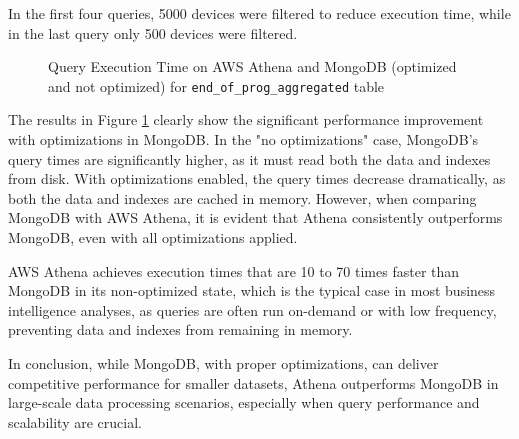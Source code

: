 In the first four queries, 5000 devices were filtered to reduce execution time, while in the last query only 500 devices were filtered.
\begin{figure}[H]
    \centering
    \caption{Query Execution Time on AWS Athena and MongoDB (optimized and not optimized) for \texttt{end\_of\_prog\_aggregated} table}
    \label{fig:eopaex}
\end{figure}

The results in Figure \ref{fig:eopaex} clearly show the significant performance improvement with optimizations in MongoDB. In the "no optimizations" case, MongoDB's query times are significantly higher, as it must read both the data and indexes from disk. With optimizations enabled, the query times decrease dramatically, as both the data and indexes are cached in memory. However, when comparing MongoDB with \ac{AWS} Athena, it is evident that Athena consistently outperforms MongoDB, even with all optimizations applied.

\ac{AWS} Athena achieves execution times that are 10 to 70 times faster than MongoDB in its non-optimized state, which is the typical case in most business intelligence analyses, as queries are often run on-demand or with low frequency, preventing data and indexes from remaining in memory.

In conclusion, while MongoDB, with proper optimizations, can deliver competitive performance for smaller datasets, Athena outperforms MongoDB in large-scale data processing scenarios, especially when query performance and scalability are crucial.

